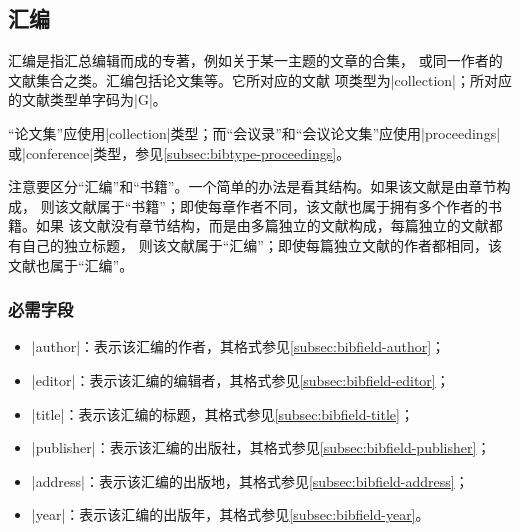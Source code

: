 
\subsection{汇编}\label{subsec:bibtype-collection}

汇编是指汇总编辑而成的专著\cite{zdic2013huibian}，例如关于某一主题的文章的合集，
或同一作者的文献集合之类。汇编包括论文集等\cite{gbt3469-1983}。它所对应的{\BibTeX}文献
项类型为|collection|；所对应的文献类型单字码为|G|\cite{gbt3469-1983}。

\begin{note}
“论文集”应使用|collection|类型；而“会议录”和“会议论文集”应使用|proceedings|
或|conference|类型，参见\ref{subsec:bibtype-proceedings}。
\end{note}

\begin{note}
注意要区分“汇编”和“书籍”。一个简单的办法是看其结构。如果该文献是由章节构成，
则该文献属于“书籍”；即使每章作者不同，该文献也属于拥有多个作者的书籍。如果
该文献没有章节结构，而是由多篇独立的文献构成，每篇独立的文献都有自己的独立标题，
则该文献属于“汇编”；即使每篇独立文献的作者都相同，该文献也属于“汇编”。
\end{note}

\subsubsection{必需字段}

\begin{itemize}
\item |author|：表示该汇编的作者，其格式参见\ref{subsec:bibfield-author}；
\item |editor|：表示该汇编的编辑者，其格式参见\ref{subsec:bibfield-editor}；
\item |title|：表示该汇编的标题，其格式参见\ref{subsec:bibfield-title}；
\item |publisher|：表示该汇编的出版社，其格式参见\ref{subsec:bibfield-publisher}；
\item |address|：表示该汇编的出版地，其格式参见\ref{subsec:bibfield-address}；
\item |year|：表示该汇编的出版年，其格式参见\ref{subsec:bibfield-year}。
\end{itemize}

